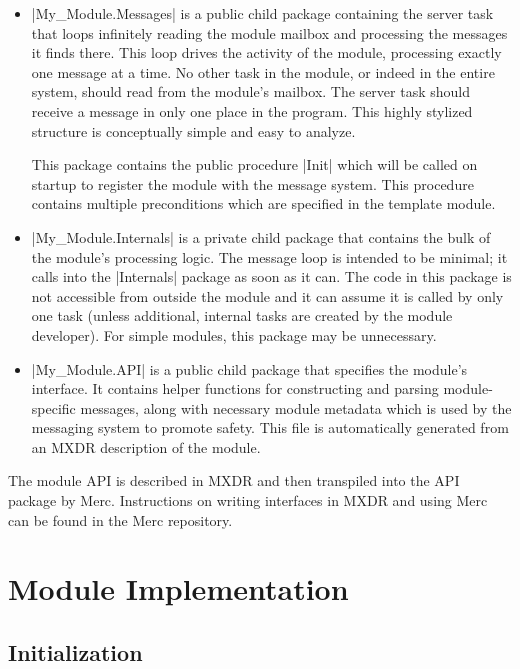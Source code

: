 \begin{itemize}
\item |My_Module.Messages| is a public child package containing the server task that loops
  infinitely reading the module mailbox and processing the messages it finds there. This loop
  drives the activity of the module, processing exactly one message at a time. No other task in
  the module, or indeed in the entire system, should read from the module's mailbox. The server task should receive a message in only one place in the program. This highly
  stylized structure is conceptually simple and easy to analyze.

  This package contains the public procedure |Init| which will be called on startup to register the module with the message system. This procedure contains multiple preconditions which are specified in the template module.

\item |My_Module.Internals| is a private child package that contains the bulk of the module's
  processing logic. The message loop is intended to be minimal; it calls into the |Internals|
  package as soon as it can. The code in this package is not accessible from outside the module
  and it can assume it is called by only one task (unless additional, internal tasks are created
  by the module developer). For simple modules, this package may be unnecessary.

\item |My_Module.API| is a public child package that specifies the module's interface. It contains helper functions for constructing
  and parsing module-specific messages, along with necessary module metadata which is used by the messaging system to promote safety. This file is automatically generated from an MXDR description of the module.
\end{itemize}

The module API is described in MXDR and then transpiled into the API package by Merc. Instructions on writing interfaces in MXDR and using Merc can be found in the Merc repository.

\section{Module Implementation}
\label{sec:module-implementation}

\subsection{Initialization}

